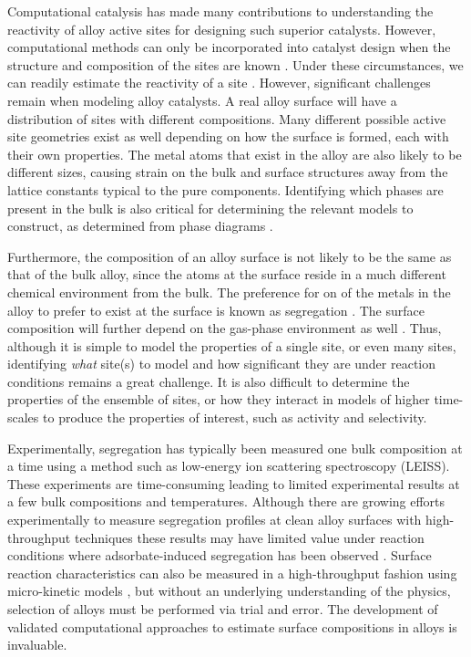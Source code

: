 \documentclass[12pt,oneside]{cmuthesis}
\begin{document}
Computational catalysis has made many contributions to understanding the reactivity of alloy active sites for designing such superior catalysts. However, computational methods can only be incorporated into catalyst design when the structure and composition of the sites are known \cite{kitchin-2008-densit-funct}. Under these circumstances, we can readily estimate the reactivity of a site \cite{greeley-2005,inoglu-2010-new-solid}. However, significant challenges remain when modeling alloy catalysts. A real alloy surface will have a distribution of sites with different compositions. Many different possible active site geometries exist as well depending on how the surface is formed, each with their own properties. The metal atoms that exist in the alloy are also likely to be different sizes, causing strain on the bulk and surface structures away from the lattice constants typical to the pure components. Identifying which phases are present in the bulk is also critical for determining the relevant models to construct, as determined from phase diagrams \cite{geng-2017-first-princ}.

Furthermore, the composition of an alloy surface is not likely to be the same as that of the bulk alloy, since the atoms at the surface reside in a much different chemical environment from the bulk. The preference for on of the metals in the alloy to prefer to exist at the surface is known as segregation \cite{dowben-1990-surfac-segreg-phenom}. The surface composition will further depend on the gas-phase environment as well \cite{kitchin-2008-alloy}. Thus, although it is simple to model the properties of a single site, or even many sites, identifying \emph{what} site(s) to model and how significant they are under reaction conditions remains a great challenge. It is also difficult to determine the properties of the ensemble of sites, or how they interact in models of higher time-scales to produce the properties of interest, such as activity and selectivity.

Experimentally, segregation has typically been measured one bulk composition at a time \cite{chen-2006-natur-activ,bocarme-2009-surfac-segreg,haire-2011-influen-prepar} using a method such as low-energy ion scattering spectroscopy (LEISS). These experiments are time-consuming leading to limited experimental results at a few bulk compositions and temperatures. Although there are growing efforts experimentally to measure segregation profiles at clean alloy surfaces with high-throughput techniques \cite{miller-2008-surfac-segreg,priyadarshini-2011-high-throug} these results may have limited value under reaction conditions where adsorbate-induced segregation has been observed \cite{kitchin-2008-alloy,menning-2009-gener-trend,kim-2013-co-adsor}. Surface reaction characteristics can also be measured in a high-throughput fashion using micro-kinetic models \cite{gumuslu-2015-correl-elect}, but without an underlying understanding of the physics, selection of alloys must be performed via trial and error. The development of validated computational approaches to estimate surface compositions in alloys is invaluable.
\end{document}
